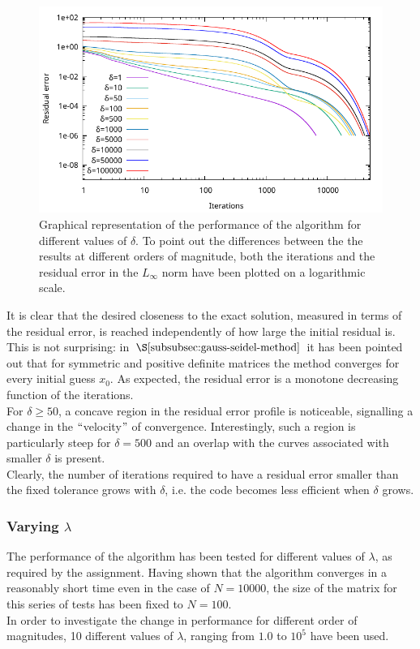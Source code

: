 \documentclass{article}
\theoremstyle{theorem}
\theoremstyle{definition}
\begin{document}
\begin{figure}[H]
	\begin{center}
		\includegraphics[width=1.0\textwidth]{Gauss_Seidel_delta}
	\end{center}
	\caption{Graphical representation of the performance of the algorithm for different values of $\delta$. To point out the differences between the the results at different orders of magnitude, both the iterations and the residual error in the $L_\infty$ norm have been plotted on a logarithmic scale.
		\label{fig:delta}}
\end{figure} 

It is clear that the desired closeness to the exact solution, measured in terms of the residual error, is reached independently of how large the initial residual is. This is not surprising: in $\S\ref{subsubsec:gauss-seidel-method}$ it has been pointed out that for symmetric and positive definite matrices the method converges for every initial guess $x_0$. As expected, the residual error is a monotone decreasing function of the iterations.\\
For $\delta\ge50$, a concave region in the residual error profile is noticeable, signalling a change in the $``$velocity$"$ of convergence. Interestingly, such a region is particularly steep for $\delta=500$ and an overlap with the curves associated with smaller $\delta$ is present.\\

Clearly, the number of iterations required to have a residual error smaller than the fixed tolerance grows with $\delta$, i.e. the code becomes less efficient when $\delta$ grows.\\

\subsubsection{Varying $\lambda$}
The performance of the algorithm has been tested for different values of $\lambda$, as required by the assignment. Having shown that the algorithm converges in a reasonably short time even in the case of $N=10000$, the size of the matrix for this series of tests has been fixed to $N=100$.\\
In order to investigate the change in performance for different order of magnitudes, 10 different values of $\lambda$, ranging from $1.0$ to $10^5$ have been used.
\end{document}
